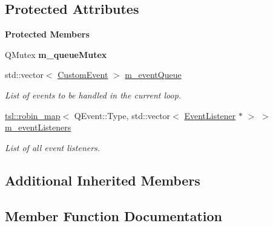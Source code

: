 \subsection*{Protected Attributes}
\begin{Indent}\textbf{ Protected Members}\par
\begin{DoxyCompactItemize}
\item 
\mbox{\label{classrev_1_1_event_manager_a44a7b8806aae072dde217f3f53364e4c}} 
Q\+Mutex {\bfseries m\+\_\+queue\+Mutex}
\item 
\mbox{\label{classrev_1_1_event_manager_a9010bbea1212f1b8e487a4d37748e661}} 
std\+::vector$<$ \mbox{\hyperlink{classrev_1_1_custom_event}{Custom\+Event}} $>$ \mbox{\hyperlink{classrev_1_1_event_manager_a9010bbea1212f1b8e487a4d37748e661}{m\+\_\+event\+Queue}}
\begin{DoxyCompactList}\small\item\em List of events to be handled in the current loop. \end{DoxyCompactList}\item 
\mbox{\hyperlink{classtsl_1_1robin__map}{tsl\+::robin\+\_\+map}}$<$ Q\+Event\+::\+Type, std\+::vector$<$ \mbox{\hyperlink{classrev_1_1_event_listener}{Event\+Listener}} $\ast$ $>$ $>$ \mbox{\hyperlink{classrev_1_1_event_manager_a379251942134025a1c87bc801951fed5}{m\+\_\+event\+Listeners}}
\begin{DoxyCompactList}\small\item\em List of all event listeners. \end{DoxyCompactList}\end{DoxyCompactItemize}
\end{Indent}
\subsection*{Additional Inherited Members}


\subsection{Member Function Documentation}
\mbox{\label{classrev_1_1_event_manager_aa272ec4b1963d76f4215361b54377b5d}} 

